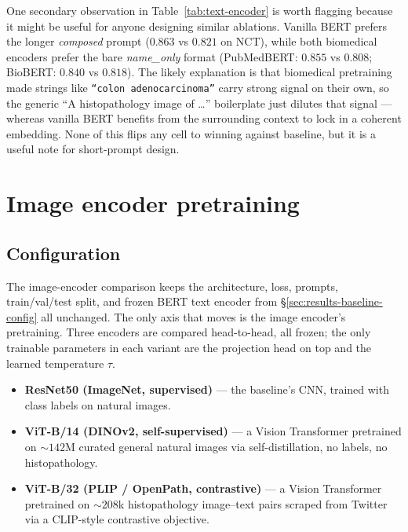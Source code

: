 One secondary observation in Table~\ref{tab:text-encoder} is worth flagging because it might be useful for anyone designing similar ablations. Vanilla BERT prefers the longer \emph{composed} prompt ($0.863$ vs $0.821$ on NCT), while both biomedical encoders prefer the bare \emph{name\_only} format (PubMedBERT: $0.855$ vs $0.808$; BioBERT: $0.840$ vs $0.818$). The likely explanation is that biomedical pretraining made strings like \texttt{``colon adenocarcinoma''} carry strong signal on their own, so the generic ``A histopathology image of \ldots'' boilerplate just dilutes that signal --- whereas vanilla BERT benefits from the surrounding context to lock in a coherent embedding. None of this flips any cell to winning against baseline, but it is a useful note for short-prompt design.


\section{Image encoder pretraining}
\label{sec:results-image-encoder}

\subsection{Configuration}

The image-encoder comparison keeps the architecture, loss, prompts, train/val/test split, and frozen BERT text encoder from §\ref{sec:results-baseline-config} all unchanged. The only axis that moves is the image encoder's pretraining. Three encoders are compared head-to-head, all frozen; the only trainable parameters in each variant are the projection head on top and the learned temperature $\tau$.

\begin{itemize}
    \item \textbf{ResNet50 (ImageNet, supervised)} --- the baseline's CNN, trained with class labels on natural images.
    \item \textbf{ViT-B/14 (DINOv2, self-supervised)} --- a Vision Transformer pretrained on $\sim 142$M curated general natural images via self-distillation, no labels, no histopathology.
    \item \textbf{ViT-B/32 (PLIP / OpenPath, contrastive)} --- a Vision Transformer pretrained on $\sim 208$k histopathology image--text pairs scraped from Twitter via a CLIP-style contrastive objective.
\end{itemize}

